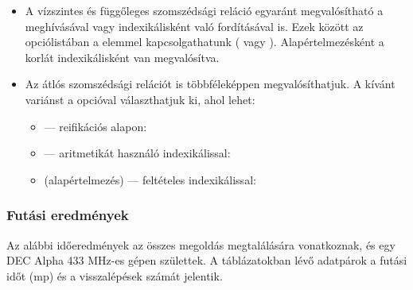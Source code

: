 \begin{itemize}
\item A vízszintes és függőleges szomszédsági reláció egyaránt megvalósítható
a  meghívásával vagy indexikálisként való fordításával is.
Ezek között az opciólistában a  elemmel kapcsolgathatunk
( vagy ). Alapértelmezésként a korlát
indexikálisként van megvalósítva.

\item Az átlós szomszédsági relációt is többféleképpen megvalósíthatjuk.
A kívánt variánst a  opcióval választhatjuk ki, ahol 
lehet:

\begin{itemize}
\item {} --- reifikációs alapon: 
\item {} --- aritmetikát használó indexikálissal:\\
\item {} (alapértelmezés) --- feltételes indexikálissal:
\end{itemize}
\end{itemize}

\subsubsection{Futási eredmények}

Az alábbi időeredmények az összes megoldás megtalálására vonatkoznak, és egy
DEC Alpha 433 MHz-es gépen születtek. A táblázatokban lévő adatpárok a futási
időt (mp) és a visszalépések számát jelentik.

